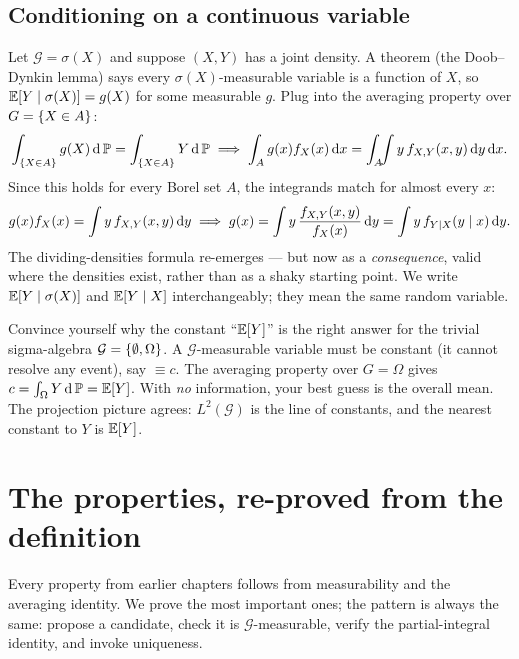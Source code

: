 \subsection{Conditioning on a continuous variable}
\label{ch38:continuous-recover}

Let $\mathcal{G} = \sigma(X)$ and suppose $(X, Y)$ has a joint density. A theorem (the Doob--Dynkin
lemma) says every $\sigma(X)$-measurable variable is a function of $X$, so $\operatorname{\mathbb{E}}[Y\mid\sigma(X)] =
g(X)$ for some measurable $g$. Plug into the averaging property over $G = \{X \in A\}$:
\[
  \int_{\{X\in A\}} g(X)\,\mathrm{d}\operatorname{\mathbb{P}} = \int_{\{X\in A\}} Y\,\mathrm{d}\operatorname{\mathbb{P}}
  \;\Longrightarrow\;
  \int_A g(x) f_X(x)\,\mathrm{d} x = \int_A \!\!\int y\, f_{X,Y}(x,y)\,\mathrm{d} y\,\mathrm{d} x.
\]
Since this holds for every Borel set $A$, the integrands match for almost every $x$:
\[
  g(x) f_X(x) = \int y\, f_{X,Y}(x,y)\,\mathrm{d} y
  \;\Longrightarrow\;
  g(x) = \int y\,\frac{f_{X,Y}(x,y)}{f_X(x)}\,\mathrm{d} y = \int y\, f_{Y\mid X}(y\mid x)\,\mathrm{d} y.
\]
The dividing-densities formula re-emerges --- but now as a \emph{consequence}, valid where the
densities exist, rather than as a shaky starting point. We write $\operatorname{\mathbb{E}}[Y\mid\sigma(X)]$ and
$\operatorname{\mathbb{E}}[Y\mid X]$ interchangeably; they mean the same random variable.

\begin{walkbox}
Convince yourself why the constant ``$\operatorname{\mathbb{E}}[Y]$'' is the right answer for the trivial sigma-algebra
$\mathcal{G} = \{\emptyset, \Omega\}$. A $\mathcal{G}$-measurable variable must be constant
(it cannot resolve any event), say $\equiv c$. The averaging property over $G = \Omega$ gives
$c = \int_\Omega Y\,\mathrm{d}\operatorname{\mathbb{P}} = \operatorname{\mathbb{E}}[Y]$. With \emph{no} information, your best guess is the overall mean.
The projection picture agrees: $L^2(\mathcal{G})$ is the line of constants, and the nearest constant
to $Y$ is $\operatorname{\mathbb{E}}[Y]$.
\end{walkbox}

\section{The properties, re-proved from the definition}
\label{ch38:properties}

Every property from earlier chapters follows from measurability and the
averaging identity. We prove the most important ones; the pattern is always the same:
propose a candidate, check it is $\mathcal{G}$-measurable, verify the partial-integral identity, and invoke
uniqueness.

